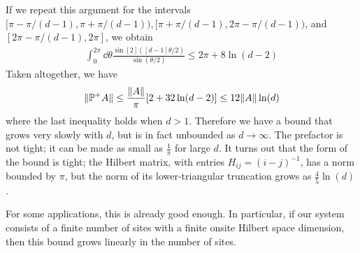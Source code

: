 \documentclass[11pt]{article}
\begin{document}
If we repeat this argument for the intervals $[\pi - \pi/(d-1), \pi +
\pi/(d-1)), [\pi + \pi/(d-1), 2\pi - \pi/(d-1))$, and $[2\pi - \pi/(d-1), 2\pi]$,
we obtain
\begin{align}
\int_{0}^{2\pi} \dd \theta \frac{\sin[2]([d-1]\theta/2)}{\sin(\theta/2)} \leq 2\pi + 8\ln(d-2)
\end{align}
Taken altogether, we have
\begin{align}
    \Vert\mathbb P^+ A\Vert \leq  \frac{\Vert A \Vert}{\pi}\qty[2+32\ln(d-2)] \leq 12\Vert A \Vert\ln(d)
\end{align}
where the last inequality holds when $d > 1$. Therefore we have a bound that
grows very slowly with $d$, but is in fact unbounded as $d \to \infty$. The
prefactor is not tight; it can be made as small as $\frac{1}{\pi}$ for large
$d$.  It turns out
that the form of the bound is tight; the Hilbert matrix, with entries $H_{ij} =
(i-j)^{-1}$, has a norm bounded by $\pi$, but the norm of its lower-triangular
truncation grows as $\frac{4}{5}\ln(d)$.

For some applications, this is already good enough. In particular, if our
system consists of a finite number of sites with a finite onsite Hilbert space
dimension, then this bound grows linearly in the number of sites.


\end{document}
